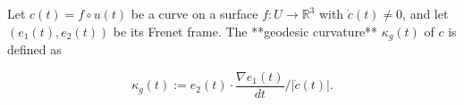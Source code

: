 Let $c(t) = f \circ u(t)$ be a curve on a surface $f: U \to \mathbb{R}^3$ with $\dot{c}(t) \neq 0$, and let $(e_1(t), e_2(t))$ be its Frenet frame. The **geodesic curvature** $\kappa_g(t)$ of $c$ is defined as

$$\kappa_g(t) := e_2(t) \cdot \frac{\nabla e_1(t)}{dt} \Big/ |\dot{c}(t)|.$$
